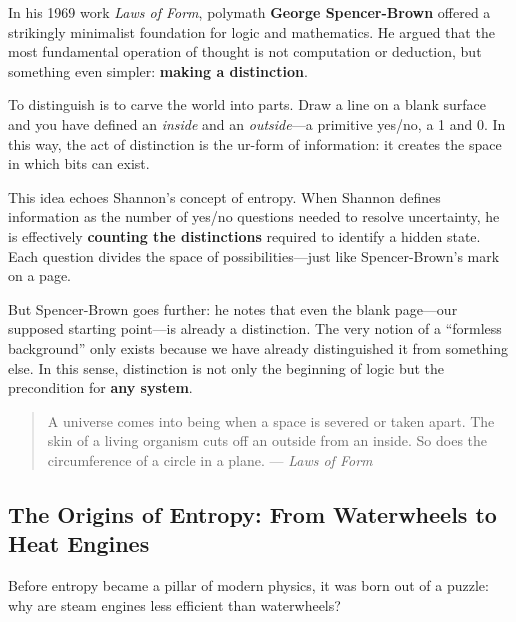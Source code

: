 \begin{tcolorbox}[title={\textbf{Historical Sidebar: Spencer-Brown and the Primordial Bit}}, colback=gray!5, colframe=black, fonttitle=\bfseries]

  In his 1969 work \emph{Laws of Form}, polymath \textbf{George Spencer-Brown} offered a strikingly minimalist foundation for logic and mathematics. He argued that the most fundamental operation of thought is not computation or deduction, but something even simpler: \textbf{making a distinction}.

  \medskip
  
  To distinguish is to carve the world into parts. Draw a line on a blank surface and you have defined an \emph{inside} and an \emph{outside}—a primitive yes/no, a 1 and 0. In this way, the act of distinction is the ur-form of information: it creates the space in which bits can exist.
  
  \medskip
  
  This idea echoes Shannon’s concept of entropy. When Shannon defines information as the number of yes/no questions needed to resolve uncertainty, he is effectively \textbf{counting the distinctions} required to identify a hidden state. Each question divides the space of possibilities—just like Spencer-Brown’s mark on a page.
  
  \medskip
  
  But Spencer-Brown goes further: he notes that even the blank page—our supposed starting point—is already a distinction. The very notion of a “formless background” only exists because we have already distinguished it from something else. In this sense, distinction is not only the beginning of logic but the precondition for \textbf{any system}.
  
  \begin{quote}
    A universe comes into being when a space is severed or taken apart. The skin of a living organism cuts off an outside from an inside. So does the circumference of a circle in a plane.  --- \textit{Laws of Form}
  \end{quote}
  
\end{tcolorbox}


\subsection{The Origins of Entropy: From Waterwheels to Heat Engines}

Before entropy became a pillar of modern physics, it was born out of a puzzle: why are steam engines less efficient than waterwheels?

